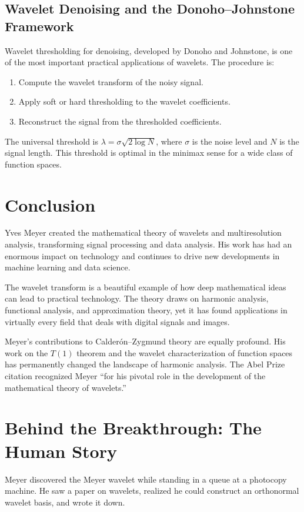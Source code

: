 \subsection{Wavelet Denoising and the Donoho--Johnstone Framework}

Wavelet thresholding for denoising, developed by Donoho and Johnstone, is one of the most important practical applications of wavelets. The procedure is:
\begin{enumerate}
\item Compute the wavelet transform of the noisy signal.
\item Apply soft or hard thresholding to the wavelet coefficients.
\item Reconstruct the signal from the thresholded coefficients.
\end{enumerate}

The universal threshold is $\lambda = \sigma \sqrt{2\log N}$, where $\sigma$ is the noise level and $N$ is the signal length. This threshold is optimal in the minimax sense for a wide class of function spaces.

\section{Conclusion}

Yves Meyer created the mathematical theory of wavelets and multiresolution analysis, transforming signal processing and data analysis. His work has had an enormous impact on technology and continues to drive new developments in machine learning and data science.

The wavelet transform is a beautiful example of how deep mathematical ideas can lead to practical technology. The theory draws on harmonic analysis, functional analysis, and approximation theory, yet it has found applications in virtually every field that deals with digital signals and images.

Meyer's contributions to Calder\'on--Zygmund theory are equally profound. His work on the $T(1)$ theorem and the wavelet characterization of function spaces has permanently changed the landscape of harmonic analysis. The Abel Prize citation recognized Meyer ``for his pivotal role in the development of the mathematical theory of wavelets.''

\section{Behind the Breakthrough: The Human Story}
Meyer discovered the Meyer wavelet while standing in a queue at a photocopy machine. He saw a paper on wavelets, realized he could construct an orthonormal wavelet basis, and wrote it down.

